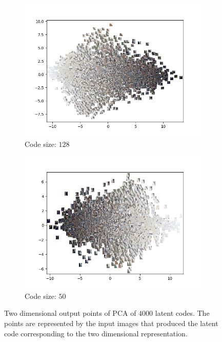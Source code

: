 \begin{figure}[H]
\begin{subfigure}{.5\textwidth}
        \centering
        \includegraphics[width=\textwidth]{images/figures/experiments_latent/pooling_dim1024_PCA_images.png}   
        \caption{Code size: $128$}
    \end{subfigure}%
    \begin{subfigure}{.5\textwidth}
        \centering
        \includegraphics[width=\textwidth]{images/figures/experiments_latent/pooling_dim50_PCA_images.png}
        \caption{Code size: $50$}
    \end{subfigure}
    \caption{Two dimensional output points of PCA of $4000$ latent codes. The points are represented by the input
    images that produced the latent code corresponding to the two dimensional representation.}
\end{figure}

